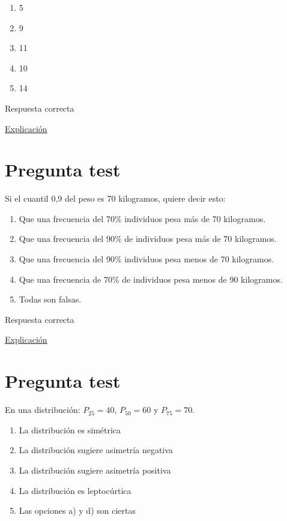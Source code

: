 \documentclass[
]{book}
\providecommand{\tightlist}{%
  \setlength{\itemsep}{0pt}\setlength{\parskip}{0pt}}
\begin{document}
\begin{enumerate}
\def\labelenumi{\alph{enumi})}
\tightlist
\item
  5
\item
  9
\item
  11
\item
  10
\item
  14
\end{enumerate}

Respuesta correcta

\href{https://1fjmanzano.github.io/bioestadistica/medidas-de-posicio\%CC\%81n-dispersio\%CC\%81n-y-forma.html\#medidas-de-posicio\%CC\%81n-centrales}{Explicación}

\hypertarget{pregunta-test-90}{%
\section{Pregunta test}\label{pregunta-test-90}}

Si el cuantil 0,9 del peso es 70 kilogramos, quiere decir esto:

\begin{enumerate}
\def\labelenumi{\alph{enumi})}
\tightlist
\item
  Que una frecuencia del 70\% individuos pesa más de 70 kilogramos.
\item
  Que una frecuencia del 90\% de individuos pesa más de 70 kilogramos.
\item
  Que una frecuencia del 90\% individuos pesa menos de 70 kilogramos.
\item
  Que una frecuencia de 70\% de individuos pesa menos de 90 kilogramos.
\item
  Todas son falsas.
\end{enumerate}

Respuesta correcta

\href{https://1fjmanzano.github.io/bioestadistica/medidas-de-posicio\%CC\%81n-dispersio\%CC\%81n-y-forma.html\#medidas-de-posicio\%CC\%81n-centrales}{Explicación}

\hypertarget{pregunta-test-91}{%
\section{Pregunta test}\label{pregunta-test-91}}

En una distribución: \(P_{25} = 40\), \(P_{50} =60\) y \(P_{75} =70\).

\begin{enumerate}
\def\labelenumi{\alph{enumi})}
\tightlist
\item
  La distribución es simétrica
\item
  La distribución sugiere asimetría negativa
\item
  La distribución sugiere asimetría positiva
\item
  La distribución es leptocúrtica
\item
  Las opciones a) y d) son ciertas
\end{enumerate}
\end{document}
